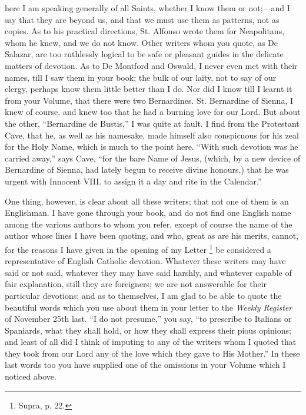 here I am speaking generally of all Saints, whether I know them or not;—and
I say that they are beyond us, and that we must use them as patterns,
not as copies. As to his practical directions, St. Alfonso wrote them
for Neapolitans, whom he knew, and we do not know. Other writers whom
you quote, as De Salazar, are too ruthlessly logical to be safe or
pleasant guides in the delicate matters of devotion. As to De Montford
and Oswald, I never even met with their names, till I saw them in your
book; the bulk of our laity, not to say of our clergy, perhaps know them
little better than I do. Nor did I know till I learnt it from your
Volume, that there were two Bernardines. St. Bernardine of Sienna, I
knew of course, and knew too that he had a burning love for our Lord.
But about the other, ``Bernardine de Bustis,'' I was quite at
fault. I find from the Protestant Cave, that he, as well as his
namesake, made himself also conspicuous for his zeal for the Holy Name,
which is much to the point here. ``With such devotion was he carried
away,'' says Cave, ``for the bare Name of Jesus, (which, by a
new device of Bernardine of Sienna, had lately begun to receive divine
honours,) that he was urgent with Innocent VIII. to assign it a day and
rite in the Calendar.''

One thing, however, is clear about all these writers; that not one of
them is an Englishman. I have gone through your book, and do not find
one English name among the various authors to whom you refer, except of
course the name of the author whose lines I have been quoting, and
who, great as are his merits, cannot, for the reasons I have given in
the opening of my Letter \footnote{Supra, p. 22.} be
considered a representative of English Catholic devotion. Whatever these
writers may have said or not said, whatever they may have said harshly,
and whatever capable of fair explanation, still they are foreigners; we
are not answerable for their particular devotions; and as to themselves,
I am glad to be able to quote the beautiful words which you use about
them in your letter to the \emph{Weekly Register} of November 25th last.
``I do not presume,'' you say, ``to prescribe to Italians or
Spaniards, what they shall hold, or how they shall express their pious
opinions; and least of all did I think of imputing to any of the writers
whom I quoted that they took from our Lord any of the love which they
gave to His Mother.'' In these last words too you have supplied one
of the omissions in your Volume which I noticed above.

